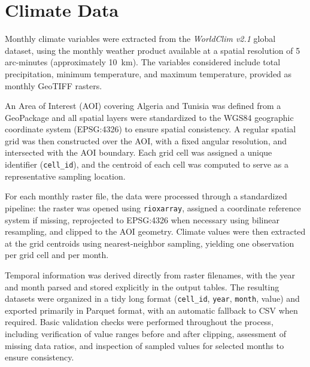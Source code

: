\section{Climate Data}\label{subsec:climate_extraction}

Monthly climate variables were extracted from the \textit{WorldClim v2.1} global dataset, using the monthly weather product available at a spatial resolution of 5 arc-minutes (approximately 10~km). The variables considered include total precipitation, minimum temperature, and maximum temperature, provided as monthly GeoTIFF rasters.

An Area of Interest (AOI) covering Algeria and Tunisia was defined from a GeoPackage and all spatial layers were standardized to the WGS84 geographic coordinate system (EPSG:4326) to ensure spatial consistency. A regular spatial grid was then constructed over the AOI, with a fixed angular resolution, and intersected with the AOI boundary. Each grid cell was assigned a unique identifier (\texttt{cell\_id}), and the centroid of each cell was computed to serve as a representative sampling location.

For each monthly raster file, the data were processed through a standardized pipeline: the raster was opened using \texttt{rioxarray}, assigned a coordinate reference system if missing, reprojected to EPSG:4326 when necessary using bilinear resampling, and clipped to the AOI geometry. Climate values were then extracted at the grid centroids using nearest-neighbor sampling, yielding one observation per grid cell and per month.

Temporal information was derived directly from raster filenames, with the year and month parsed and stored explicitly in the output tables. The resulting datasets were organized in a tidy long format (\texttt{cell\_id}, \texttt{year}, \texttt{month}, value) and exported primarily in Parquet format, with an automatic fallback to CSV when required. Basic validation checks were performed throughout the process, including verification of value ranges before and after clipping, assessment of missing data ratios, and inspection of sampled values for selected months to ensure consistency.
